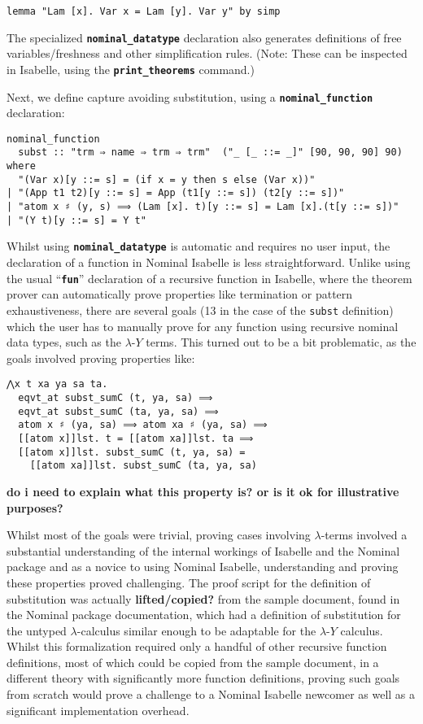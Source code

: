 \documentclass[a4paper, 12pt, twoside]{style/ociamthesis}
\theoremstyle{plain}
\theoremstyle{definition}
\theoremstyle{remark}
\newcommand{\lamy}{\lambda\text{-}Y}
\begin{document}
\begin{verbatim}
lemma "Lam [x]. Var x = Lam [y]. Var y" by simp
\end{verbatim}

The specialized \textbf{\texttt{nominal\_datatype}} declaration also
generates definitions of free variables/freshness and other
simplification rules. (Note: These can be inspected in Isabelle, using
the \textbf{\texttt{print\_theorems}} command.)

Next, we define capture avoiding substitution, using a
\textbf{\texttt{nominal\_function}} declaration:

\begin{verbatim}
nominal_function
  subst :: "trm ⇒ name ⇒ trm ⇒ trm"  ("_ [_ ::= _]" [90, 90, 90] 90)
where
  "(Var x)[y ::= s] = (if x = y then s else (Var x))"
| "(App t1 t2)[y ::= s] = App (t1[y ::= s]) (t2[y ::= s])"
| "atom x ♯ (y, s) ⟹ (Lam [x]. t)[y ::= s] = Lam [x].(t[y ::= s])"
| "(Y t)[y ::= s] = Y t"
\end{verbatim}

Whilst using \textbf{\texttt{nominal\_datatype}} is automatic and
requires no user input, the declaration of a function in Nominal
Isabelle is less straightforward. Unlike using the usual
``\textbf{\texttt{fun}}'' declaration of a recursive function in
Isabelle, where the theorem prover can automatically prove properties
like termination or pattern exhaustiveness, there are several goals (13
in the case of the \texttt{subst} definition) which the user has to
manually prove for any function using recursive nominal data types, such
as the \(\lamy\) terms. This turned out to be a bit problematic, as the
goals involved proving properties like:

\begin{verbatim}
⋀x t xa ya sa ta.
  eqvt_at subst_sumC (t, ya, sa) ⟹
  eqvt_at subst_sumC (ta, ya, sa) ⟹
  atom x ♯ (ya, sa) ⟹ atom xa ♯ (ya, sa) ⟹ 
  [[atom x]]lst. t = [[atom xa]]lst. ta ⟹ 
  [[atom x]]lst. subst_sumC (t, ya, sa) = 
    [[atom xa]]lst. subst_sumC (ta, ya, sa)
\end{verbatim}

\textbf{do i need to explain what this property is? or is it ok for
illustrative purposes?}

Whilst most of the goals were trivial, proving cases involving
\(\lambda\)-terms involved a substantial understanding of the internal
workings of Isabelle and the Nominal package and as a novice to using
Nominal Isabelle, understanding and proving these properties proved
challenging. The proof script for the definition of substitution was
actually \textbf{lifted/copied?} from the sample document, found in the
Nominal package documentation, which had a definition of substitution
for the untyped \(\lambda\)-calculus similar enough to be adaptable for
the \(\lamy\) calculus.\\
Whilst this formalization required only a handful of other recursive
function definitions, most of which could be copied from the sample
document, in a different theory with significantly more function
definitions, proving such goals from scratch would prove a challenge to
a Nominal Isabelle newcomer as well as a significant implementation
overhead.
\end{document}
